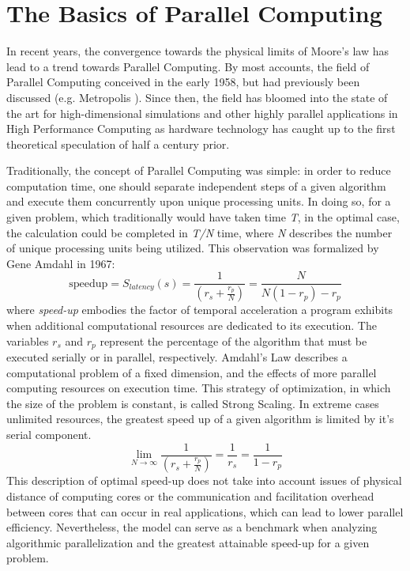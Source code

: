 \section{The Basics of Parallel Computing}
In recent years, the convergence towards the physical limits of Moore's law has lead to a
trend towards Parallel Computing\cite{Kumar}\cite{Markov}.  By most accounts, the
field of Parallel Computing conceived in the early 1958\cite{Gill}, but had previously
been discussed (e.g. Metropolis \cite{Metropolis}). Since then, the field has
 bloomed into the state of the art for high-dimensional simulations and
 other highly parallel applications in
High Performance Computing as hardware technology has caught up to the first
theoretical speculation of half a century prior. \par

Traditionally, the concept of Parallel Computing was simple: in order to
reduce computation time, one should separate independent steps of a given algorithm
and execute them concurrently upon unique processing units.  In doing so, for a given
problem, which traditionally would have taken time \textit{T}, in the optimal case,
the calculation could be completed in \textit{T/N} time, where \textit{N} describes
the number of unique processing units being utilized.  This observation was formalized
by Gene Amdahl in 1967\cite{Wilt}:
%
\begin{equation}
  \tag{Amdahl's Law}
  \text{speedup} = S_{latency}(s)= \frac{1}{(r_{s} + \frac{r_{p}}{N})} = \frac{N}{N(1-r_{p})-r_{p}}
  \label{egn:Amdahl}
\end{equation}
%
where \textit{\gls{speed-up}} embodies the factor of temporal acceleration a program
exhibits when additional computational resources are dedicated to its execution.
The variables \textit{$r_{s}$} and \textit{$ r_{p} $} represent the percentage of
 the algorithm that must be executed serially or in parallel, respectively.
   Amdahl's Law describes a computational problem of a fixed dimension,
and the effects of more parallel computing resources on execution time.
This strategy of optimization, in which the size of the problem is constant,
 is called Strong Scaling.
In extreme cases unlimited resources, the greatest speed up of a given algorithm
 is limited by it's serial component.
%
\begin{equation}
 \lim_{N\to\infty}  \frac{1}{(r_{s} + \frac{r_{p}}{N})} = \frac{1}{r_{s}} = \frac{1}{1-r_{p}}
\end{equation}
%
This description of optimal \gls{speed-up} does not take into account issues of physical
distance of computing cores or the communication and facilitation overhead between
cores that can occur in real applications, which can lead to lower parallel efficiency.
Nevertheless, the model can serve as a benchmark when analyzing algorithmic
parallelization and  the greatest attainable speed-up for a given problem.\par

